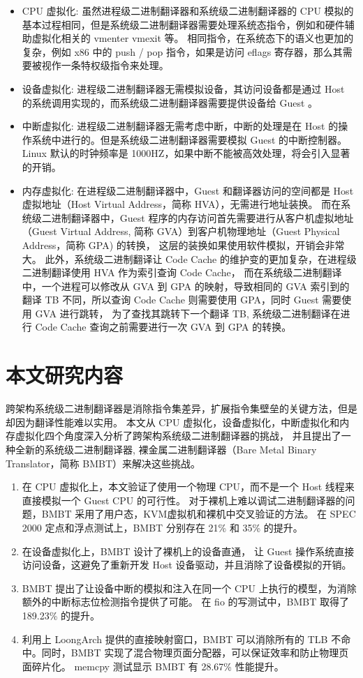 \begin{itemize}
	\item CPU 虚拟化: 虽然进程级二进制翻译器和系统级二进制翻译器的 CPU 模拟的基本过程相同，但是系统级二进制翻译器需要处理系统态指令，例如和硬件辅助虚拟化相关的 vmenter vmexit 等。
	      相同指令，在系统态下的语义也更加的复杂，例如 x86 中的 push / pop 指令，如果是访问 eflags 寄存器，那么其需要被视作一条特权级指令来处理。
	\item 设备虚拟化: 进程级二进制翻译器无需模拟设备，其访问设备都是通过 Host 的系统调用实现的，而系统级二进制翻译器需要提供设备给 Guest 。
	\item 中断虚拟化: 进程级二进制翻译器无需考虑中断，中断的处理是在 Host 的操作系统中进行的。但是系统级二进制翻译器需要模拟 Guest 的中断控制器。
	      Linux 默认的时钟频率是 1000HZ，如果中断不能被高效处理，将会引入显著的开销。
	\item 内存虚拟化: 在进程级二进制翻译器中，Guest 和翻译器访问的空间都是 Host 虚拟地址（Host Virtual Address，简称 HVA），无需进行地址装换。
	      而在系统级二进制翻译器中，Guest 程序的内存访问首先需要进行从客户机虚拟地址（Guest Virtual Address, 简称 GVA）到客户机物理地址（Guest Physical Address，简称 GPA) 的转换，
	      这层的装换如果使用软件模拟，开销会非常大。
	      此外，系统级二进制翻译让 Code Cache 的维护变的更加复杂，在进程级二进制翻译使用 HVA 作为索引查询 Code Cache，
	      而在系统级二进制翻译中，一个进程可以修改从 GVA 到 GPA 的映射，导致相同的 GVA 索引到的翻译 TB 不同，所以查询 Code Cache 则需要使用 GPA，同时 Guest 需要使用 GVA 进行跳转，
	      为了查找其跳转下一个翻译 TB, 系统级二进制翻译在进行 Code Cache 查询之前需要进行一次 GVA 到 GPA 的转换。
\end{itemize}
\section {本文研究内容}
跨架构系统级二进制翻译器是消除指令集差异，扩展指令集壁垒的关键方法，但是却因为翻译性能难以实用。
本文从 CPU 虚拟化，设备虚拟化，中断虚拟化和内存虚拟化四个角度深入分析了跨架构系统级二进制翻译器的挑战，
并且提出了一种全新的系统级二进制翻译器, 裸金属二进制翻译器（Bare Metal Binary Translator，简称 BMBT）来解决这些挑战。

\begin{enumerate}
	\item 在 CPU 虚拟化上，本文验证了使用一个物理 CPU，而不是一个 Host 线程来直接模拟一个 Guest CPU 的可行性。
	      对于裸机上难以调试二进制翻译器的问题，BMBT 采用了用户态，KVM虚拟机和裸机中交叉验证的方法。
	      在 SPEC 2000 定点和浮点测试上，BMBT 分别存在 21\% 和 35\% 的提升。
	\item 在设备虚拟化上，BMBT 设计了裸机上的设备直通， 让 Guest 操作系统直接访问设备，这避免了重新开发 Host 设备驱动，并且消除了设备模拟的开销。
	\item BMBT 提出了让设备中断的模拟和注入在同一个 CPU 上执行的模型，为消除额外的中断标志位检测指令提供了可能。
	      在 fio 的写测试中，BMBT 取得了 189.23\% 的提升。
	\item 利用上 LoongArch 提供的直接映射窗口，BMBT 可以消除所有的 TLB 不命中。同时，BMBT 实现了混合物理页面分配器，可以保证效率和防止物理页面碎片化。
	      memcpy 测试显示 BMBT 有 28.67\% 性能提升。
\end{enumerate}

